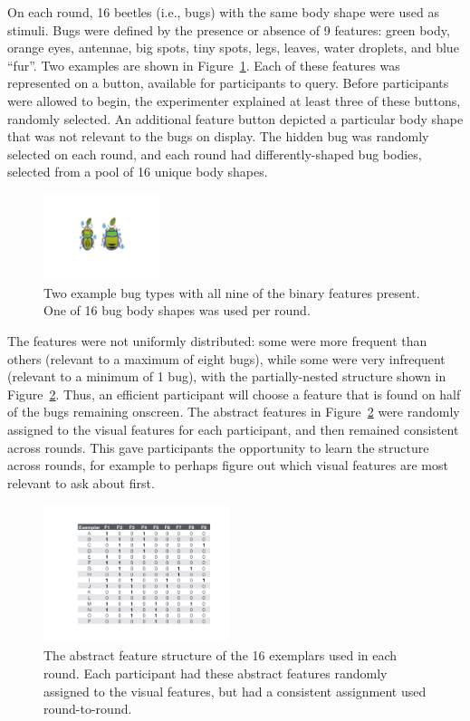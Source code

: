 \documentclass[10pt,letterpaper]{article}
\begin{document}
On each round, 16 beetles (i.e., bugs) with the same body shape were used as stimuli. Bugs were defined by the presence or absence of 9 features: green body, orange eyes, antennae, big spots, tiny spots, legs, leaves, water droplets, and blue ``fur''. Two examples are shown in Figure~\ref{fig:example_bugs}. Each of these features was represented on a button, available for participants to query. Before participants were allowed to begin, the experimenter explained at least three of these buttons, randomly selected. An additional feature button depicted a particular body shape that was not relevant to the bugs on display. The hidden bug was randomly selected on each round, and each round had differently-shaped bug bodies, selected from a pool of 16 unique body shapes.

\begin{figure}[!h]
  \centering
  \includegraphics[width=0.3\textwidth]{figures/example_bugs}
  \caption{Two example bug types with all nine of the binary features present. One of 16 bug body shapes was used per round.}
  \label{fig:example_bugs}
\end{figure} 

The features were not uniformly distributed: some were more frequent than others (relevant to a maximum of eight bugs), while some were very infrequent (relevant to a minimum of 1 bug), with the partially-nested structure shown in Figure~\ref{fig:feature_table}. Thus, an efficient participant will choose a feature that is found on half of the bugs remaining onscreen. The abstract features in Figure~\ref{fig:feature_table} were randomly assigned to the visual features for each participant, and then remained consistent across rounds. This gave participants the opportunity to learn the structure across rounds, for example to perhaps figure out which visual features are most relevant to ask about first.

\begin{figure}[!h]
  \centering
  \includegraphics[width=0.48\textwidth]{figures/feature_table}
  \caption{The abstract feature structure of the 16 exemplars used in each round. Each participant had these abstract features randomly assigned to the visual features, but had a consistent assignment used round-to-round.}
  \label{fig:feature_table}
\end{figure} 
\end{document}
